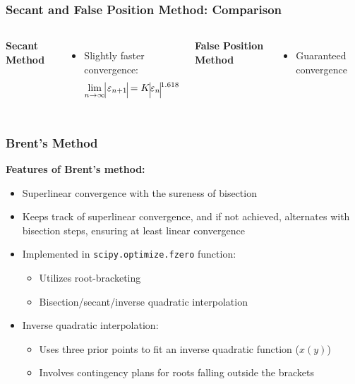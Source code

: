 \begin{frame}[fragile]
  \frametitle{Secant and False Position Method: Comparison}

  \begin{columns}
    \textbf{Secant Method}
    \vspace{0.1cm}
    \newline

    

    \begin{itemize}
      \item Slightly faster convergence:
            \[
              \lim_{n \to \infty} \vline\varepsilon_{n+1}\vline = K\vline\varepsilon_n\vline^{1.618}
            \]
    \end{itemize}

    \textbf{False Position Method}
    \vspace{0.3cm}
    \newline
    
    \begin{itemize}
      \item Guaranteed convergence
    \end{itemize}
  \end{columns}
\end{frame}

\begin{frame}[fragile]
  \frametitle{Brent's Method}

  \textbf{Features of Brent's method:}
  \begin{itemize}
    \item Superlinear convergence with the sureness of bisection
    \item Keeps track of superlinear convergence, and if not achieved, alternates with bisection steps, ensuring at least linear convergence
    \item Implemented in \lstinline|scipy.optimize.fzero| function:
          \begin{itemize}
            \item Utilizes root-bracketing
            \item Bisection/secant/inverse quadratic interpolation
          \end{itemize}
    \item Inverse quadratic interpolation:
          \begin{itemize}
            \item Uses three prior points to fit an inverse quadratic function ($x(y)$)
            \item Involves contingency plans for roots falling outside the brackets
          \end{itemize}
  \end{itemize}

\end{frame}

